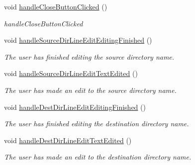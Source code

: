 \begin{DoxyCompactItemize}
void \hyperlink{class_main_window_a63e1e9e78dfd3d3e91943467ca01d2f9}{handle\+Close\+Button\+Clicked} ()
\begin{DoxyCompactList}\small\item\em handle\+Close\+Button\+Clicked \end{DoxyCompactList}\item 
\mbox{\label{class_main_window_ab2e19e743a5f3decdc2357d38b7d0210}} 
void \hyperlink{class_main_window_ab2e19e743a5f3decdc2357d38b7d0210}{handle\+Source\+Dir\+Line\+Edit\+Editing\+Finished} ()
\begin{DoxyCompactList}\small\item\em The user has finished editing the source directory name. \end{DoxyCompactList}\item 
\mbox{\label{class_main_window_a2f4da079c766e6d57b985921ff0697d4}} 
void \hyperlink{class_main_window_a2f4da079c766e6d57b985921ff0697d4}{handle\+Source\+Dir\+Line\+Edit\+Text\+Edited} ()
\begin{DoxyCompactList}\small\item\em The user has made an edit to the source directory name. \end{DoxyCompactList}\item 
\mbox{\label{class_main_window_a266ea611700bed71bf603486d32d4d9e}} 
void \hyperlink{class_main_window_a266ea611700bed71bf603486d32d4d9e}{handle\+Dest\+Dir\+Line\+Edit\+Editing\+Finished} ()
\begin{DoxyCompactList}\small\item\em The user has finished editing the destination directory name. \end{DoxyCompactList}\item 
\mbox{\label{class_main_window_a4aa3df85f0feb5b90bbdd62a482fc378}} 
void \hyperlink{class_main_window_a4aa3df85f0feb5b90bbdd62a482fc378}{handle\+Dest\+Dir\+Line\+Edit\+Text\+Edited} ()
\begin{DoxyCompactList}\small\item\em The user has made an edit to the destination directory name. \end{DoxyCompactList}\end{DoxyCompactItemize}
